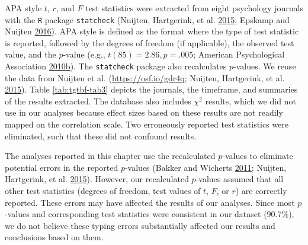 \documentclass[a5paper]{book}
\begin{document}
APA style \(t\), \(r\), and \(F\) test statistics were extracted from
eight psychology journals with the \texttt{R} package \texttt{statcheck}
(Nuijten, Hartgerink, et al.
\protect\hyperlink{ref-doi:10.3758ux2fs13428-015-0664-2}{2015}; Epskamp
and Nuijten \protect\hyperlink{ref-statcheck}{2016}). APA style is
defined as the format where the type of test statistic is reported,
followed by the degrees of freedom (if applicable), the observed test
value, and the \(p\)-value (e.g., \(t(85)=2.86, p=.005\); American
Psychological Association
\protect\hyperlink{ref-isbn:9781433805615}{2010}\protect\hyperlink{ref-isbn:9781433805615}{b}).
The \texttt{statcheck} package also recalculates \(p\)-values. We reuse
the data from Nuijten et al. (\url{https://osf.io/gdr4q}; Nuijten,
Hartgerink, et al.
\protect\hyperlink{ref-doi:10.3758ux2fs13428-015-0664-2}{2015}). Table
\ref{tab:tgtbf-tab3} depicts the journals, the timeframe, and summaries
of the results extracted. The database also includes \(\chi^2\) results,
which we did not use in our analyses because effect sizes based on these
results are not readily mapped on the correlation scale. Two erroneously
reported test statistics were eliminated, such that these did not
confound results.

The analyses reported in this chapter use the recalculated \(p\)-values
to eliminate potential errors in the reported \(p\)-values (Bakker and
Wicherts \protect\hyperlink{ref-doi:10.3758ux2fs13428-011-0089-5}{2011};
Nuijten, Hartgerink, et al.
\protect\hyperlink{ref-doi:10.3758ux2fs13428-015-0664-2}{2015}).
However, our recalculated \(p\)-values assumed that all other test
statistics (degrees of freedom, test values of \(t\), \(F\), or \(r\))
are correctly reported. These errors may have affected the results of
our analyses. Since most \(p\)-values and corresponding test statistics
were consistent in our dataset (90.7\%), we do not believe these typing
errors substantially affected our results and conclusions based on them.
\end{document}
